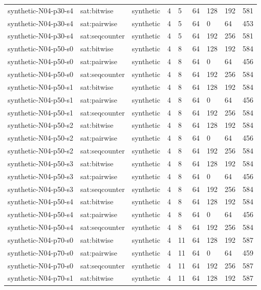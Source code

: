 \begin{tabular}{lllllllll}
synthetic-N04-p30-s4 & sat:bitwise & synthetic & 4 & 5 & 64 & 128 & 192 & 581 \\
synthetic-N04-p30-s4 & sat:pairwise & synthetic & 4 & 5 & 64 & 0 & 64 & 453 \\
synthetic-N04-p30-s4 & sat:seqcounter & synthetic & 4 & 5 & 64 & 192 & 256 & 581 \\
synthetic-N04-p50-s0 & sat:bitwise & synthetic & 4 & 8 & 64 & 128 & 192 & 584 \\
synthetic-N04-p50-s0 & sat:pairwise & synthetic & 4 & 8 & 64 & 0 & 64 & 456 \\
synthetic-N04-p50-s0 & sat:seqcounter & synthetic & 4 & 8 & 64 & 192 & 256 & 584 \\
synthetic-N04-p50-s1 & sat:bitwise & synthetic & 4 & 8 & 64 & 128 & 192 & 584 \\
synthetic-N04-p50-s1 & sat:pairwise & synthetic & 4 & 8 & 64 & 0 & 64 & 456 \\
synthetic-N04-p50-s1 & sat:seqcounter & synthetic & 4 & 8 & 64 & 192 & 256 & 584 \\
synthetic-N04-p50-s2 & sat:bitwise & synthetic & 4 & 8 & 64 & 128 & 192 & 584 \\
synthetic-N04-p50-s2 & sat:pairwise & synthetic & 4 & 8 & 64 & 0 & 64 & 456 \\
synthetic-N04-p50-s2 & sat:seqcounter & synthetic & 4 & 8 & 64 & 192 & 256 & 584 \\
synthetic-N04-p50-s3 & sat:bitwise & synthetic & 4 & 8 & 64 & 128 & 192 & 584 \\
synthetic-N04-p50-s3 & sat:pairwise & synthetic & 4 & 8 & 64 & 0 & 64 & 456 \\
synthetic-N04-p50-s3 & sat:seqcounter & synthetic & 4 & 8 & 64 & 192 & 256 & 584 \\
synthetic-N04-p50-s4 & sat:bitwise & synthetic & 4 & 8 & 64 & 128 & 192 & 584 \\
synthetic-N04-p50-s4 & sat:pairwise & synthetic & 4 & 8 & 64 & 0 & 64 & 456 \\
synthetic-N04-p50-s4 & sat:seqcounter & synthetic & 4 & 8 & 64 & 192 & 256 & 584 \\
synthetic-N04-p70-s0 & sat:bitwise & synthetic & 4 & 11 & 64 & 128 & 192 & 587 \\
synthetic-N04-p70-s0 & sat:pairwise & synthetic & 4 & 11 & 64 & 0 & 64 & 459 \\
synthetic-N04-p70-s0 & sat:seqcounter & synthetic & 4 & 11 & 64 & 192 & 256 & 587 \\
synthetic-N04-p70-s1 & sat:bitwise & synthetic & 4 & 11 & 64 & 128 & 192 & 587 \\

\end{tabular}
